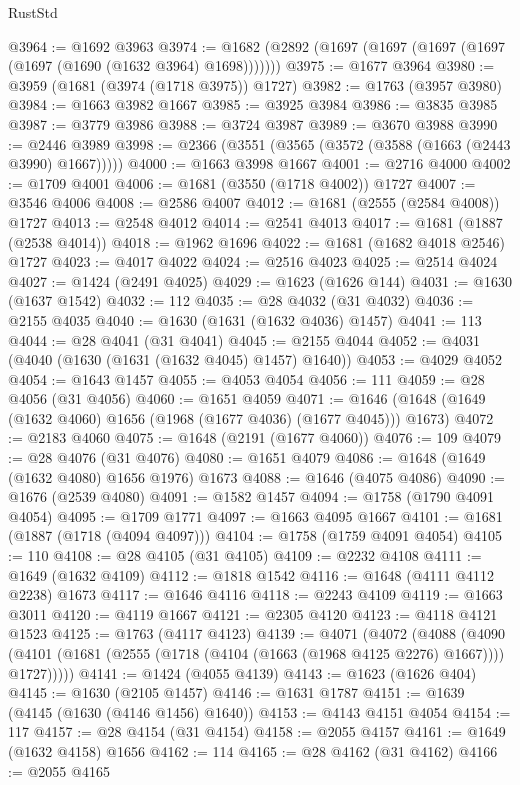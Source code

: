 \begin{lexlean}{RustStd}
\begin{coremodule}
@3964 := @1692 @3963
@3974 := @1682 (@2892 (@1697 (@1697 (@1697 (@1697 (@1697 (@1690 (@1632 @3964) @1698)))))))
@3975 := @1677 @3964
@3980 := @3959 (@1681 (@3974 (@1718 @3975)) @1727)
@3982 := @1763 (@3957 @3980)
@3984 := @1663 @3982 @1667
@3985 := @3925 @3984
@3986 := @3835 @3985
@3987 := @3779 @3986
@3988 := @3724 @3987
@3989 := @3670 @3988
@3990 := @2446 @3989
@3998 := @2366 (@3551 (@3565 (@3572 (@3588 (@1663 (@2443 @3990) @1667)))))
@4000 := @1663 @3998 @1667
@4001 := @2716 @4000
@4002 := @1709 @4001
@4006 := @1681 (@3550 (@1718 @4002)) @1727
@4007 := @3546 @4006
@4008 := @2586 @4007
@4012 := @1681 (@2555 (@2584 @4008)) @1727
@4013 := @2548 @4012
@4014 := @2541 @4013
@4017 := @1681 (@1887 (@2538 @4014))
@4018 := @1962 @1696
@4022 := @1681 (@1682 @4018 @2546) @1727
@4023 := @4017 @4022
@4024 := @2516 @4023
@4025 := @2514 @4024
@4027 := @1424 (@2491 @4025)
@4029 := @1623 (@1626 @144)
@4031 := @1630 (@1637 @1542)
@4032 := 112
@4035 := @28 @4032 (@31 @4032)
@4036 := @2155 @4035
@4040 := @1630 (@1631 (@1632 @4036) @1457)
@4041 := 113
@4044 := @28 @4041 (@31 @4041)
@4045 := @2155 @4044
@4052 := @4031 (@4040 (@1630 (@1631 (@1632 @4045) @1457) @1640))
@4053 := @4029 @4052
@4054 := @1643 @1457
@4055 := @4053 @4054
@4056 := 111
@4059 := @28 @4056 (@31 @4056)
@4060 := @1651 @4059
@4071 := @1646 (@1648 (@1649 (@1632 @4060) @1656 (@1968 (@1677 @4036) (@1677 @4045))) @1673)
@4072 := @2183 @4060
@4075 := @1648 (@2191 (@1677 @4060))
@4076 := 109
@4079 := @28 @4076 (@31 @4076)
@4080 := @1651 @4079
@4086 := @1648 (@1649 (@1632 @4080) @1656 @1976) @1673
@4088 := @1646 (@4075 @4086)
@4090 := @1676 (@2539 @4080)
@4091 := @1582 @1457
@4094 := @1758 (@1790 @4091 @4054)
@4095 := @1709 @1771
@4097 := @1663 @4095 @1667
@4101 := @1681 (@1887 (@1718 (@4094 @4097)))
@4104 := @1758 (@1759 @4091 @4054)
@4105 := 110
@4108 := @28 @4105 (@31 @4105)
@4109 := @2232 @4108
@4111 := @1649 (@1632 @4109)
@4112 := @1818 @1542
@4116 := @1648 (@4111 @4112 @2238) @1673
@4117 := @1646 @4116
@4118 := @2243 @4109
@4119 := @1663 @3011
@4120 := @4119 @1667
@4121 := @2305 @4120
@4123 := @4118 @4121 @1523
@4125 := @1763 (@4117 @4123)
@4139 := @4071
    (@4072
      (@4088
        (@4090 (@4101 (@1681 (@2555 (@1718 (@4104 (@1663 (@1968 @4125 @2276) @1667)))) @1727)))))
@4141 := @1424 (@4055 @4139)
@4143 := @1623 (@1626 @404)
@4145 := @1630 (@2105 @1457)
@4146 := @1631 @1787
@4151 := @1639 (@4145 (@1630 (@4146 @1456) @1640))
@4153 := @4143 @4151 @4054
@4154 := 117
@4157 := @28 @4154 (@31 @4154)
@4158 := @2055 @4157
@4161 := @1649 (@1632 @4158) @1656
@4162 := 114
@4165 := @28 @4162 (@31 @4162)
@4166 := @2055 @4165

\end{coremodule}
\end{lexlean}
